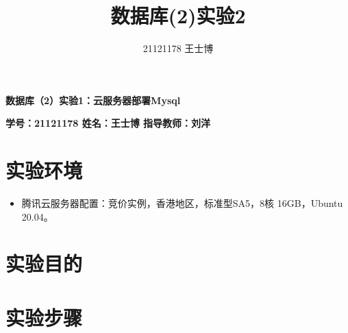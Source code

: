 \documentclass{article}
\title{\Huge 数据库(2)实验2}
\author{21121178 王士博}
\begin{document}
\begin{center}
    \textbf{\huge 数据库（2）实验1：云服务器部署Mysql}
\end{center}
\begin{center}
    \textbf{\large \textbf{学号：21121178 \quad 姓名：王士博 \quad 指导教师：刘洋}}
\end{center}
\hrulefill
\section{实验环境}
\begin{itemize}
    \item 腾讯云服务器配置：竞价实例，香港地区，标准型SA5，8核 16GB，Ubuntu 20.04。
\end{itemize}
\section{实验目的}
\section{实验步骤}
\end{document}
